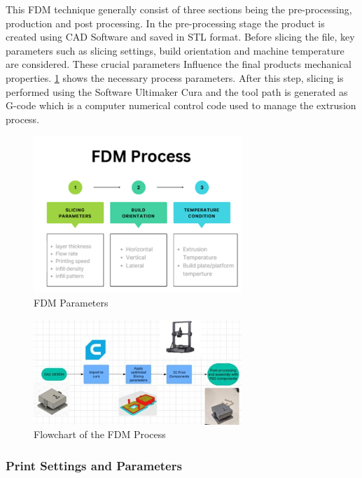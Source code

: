 This FDM technique generally consist of three sections being the pre-processing, production and post processing. 
In the pre-processing stage the product is created using CAD Software and saved in STL format. 
Before slicing the file, key parameters such as slicing settings, build orientation and machine temperature are considered. 
These crucial parameters Influence the final products mechanical properties. \ref{fig:FDMparameters} shows the necessary process parameters. 
After this step, slicing is performed using the Software Ultimaker Cura and the tool path is generated as G-code which is a computer numerical control code used to manage the extrusion process.

\begin{figure}[htbp]
    \centering
    \includegraphics[width=0.7\textwidth]{figures/CAD-3DPrint/FDMflowchart.png}
    \caption{FDM Parameters }
    \label{fig:FDMparameters}
    
\end{figure}

\begin{figure}[htbp]
    \centering
    \includegraphics[width=0.7\textwidth]{figures/CAD-3DPrint/FullFlowChart.jpg}
    \caption{Flowchart of the FDM Process}
    \label{fig:FDMflowchart}
    
\end{figure}

\subsubsection{Print Settings and Parameters} 
